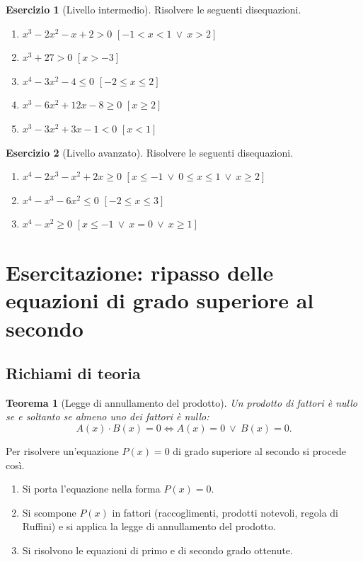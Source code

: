 \documentclass[12pt,a4paper,openany]{book}
\theoremstyle{definition}
\newtheorem{esercizio}{Esercizio}[section]
\theoremstyle{plain}
\newtheorem{teorema}{Teorema}[section]
\theoremstyle{remark}
\begin{document}
\begin{esercizio}[Livello intermedio]
Risolvere le seguenti disequazioni.
\begin{enumerate}[label=\alph*)]
\item $x^3-2x^2-x+2>0$ \hfill $[-1<x<1\ \lor\ x>2]$
\item $x^3+27>0$ \hfill $[x>-3]$
\item $x^4-3x^2-4\le 0$ \hfill $[-2\le x\le 2]$
\item $x^3-6x^2+12x-8\ge 0$ \hfill $[x\ge 2]$
\item $x^3-3x^2+3x-1<0$ \hfill $[x<1]$
\end{enumerate}
\end{esercizio}

\begin{esercizio}[Livello avanzato]
Risolvere le seguenti disequazioni.
\begin{enumerate}[label=\alph*)]
\item $x^4-2x^3-x^2+2x\ge 0$ \hfill $[x\le -1\ \lor\ 0\le x\le 1\ \lor\ x\ge 2]$
\item $x^4-x^3-6x^2\le 0$ \hfill $[-2\le x\le 3]$
\item $x^4-x^2\ge 0$ \hfill $[x\le -1\ \lor\ x=0\ \lor\ x\ge 1]$
\end{enumerate}
\end{esercizio}

\section{Esercitazione: ripasso delle equazioni di grado superiore al secondo}

\subsection*{Richiami di teoria}

\begin{teorema}[Legge di annullamento del prodotto]
Un prodotto di fattori è nullo se e soltanto se almeno uno dei fattori è nullo:
\[
A(x)\cdot B(x)=0\iff A(x)=0\ \lor\ B(x)=0.
\]
\end{teorema}

Per risolvere un'equazione $P(x)=0$ di grado superiore al secondo si procede così.
\begin{enumerate}[label=\arabic*)]
\item Si porta l'equazione nella forma $P(x)=0$.
\item Si scompone $P(x)$ in fattori (raccoglimenti, prodotti notevoli, regola di Ruffini) e si applica la legge di annullamento del prodotto.
\item Si risolvono le equazioni di primo e di secondo grado ottenute.
\end{enumerate}
\end{document}
